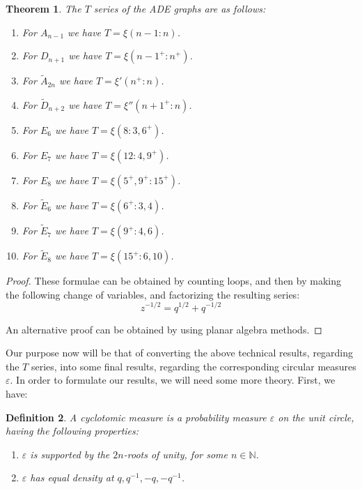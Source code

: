 \documentclass[12pt]{amsbook}
\newtheorem{theorem}{Theorem}[chapter]
\newtheorem{definition}[theorem]{Definition}
\begin{document}
\begin{theorem}
The $T$ series of the ADE graphs are as follows:
\begin{enumerate}
\item For $A_{n-1}$ we have $T=\xi(n-1:n)$.

\item For $D_{n+1}$ we have $T=\xi(n-1^+:n^+)$.

\item For $\tilde{A}_{2n}$ we have $T=\xi'(n^+:n)$.

\item For $\tilde{D}_{n+2}$ we have $T=\xi''(n+1^+:n)$.

\item For $E_6$ we have $T=\xi(8:3,6^+)$.

\item For $E_7$ we have $T=\xi(12:4,9^+)$.

\item For $E_8$ we have $T=\xi(5^+,9^+:15^+)$.

\item For $\tilde{E}_6$ we have $T=\xi(6^+:3,4)$.

\item For $\tilde{E}_7$ we have $T=\xi(9^+:4,6)$.

\item For $\tilde{E}_8$ we have $T=\xi(15^+:6,10)$.
\end{enumerate}
\end{theorem}

\begin{proof}
These formulae can be obtained by counting loops, and then by making the following change of variables, and factorizing the resulting series:
$$z^{-1/2}=q^{1/2}+q^{-1/2}$$

An alternative proof can be obtained by using planar algebra methods.
\end{proof}

Our purpose now will be that of converting the above technical results, regarding the $T$ series, into some final results, regarding the corresponding circular measures $\varepsilon$. In order to formulate our results, we will need some more theory. First, we have:

\begin{definition}
A cyclotomic measure is a probability measure $\varepsilon$ on the unit circle, having the following properties:
\begin{enumerate}
\item  $\varepsilon$ is supported by the $2n$-roots of unity, for some $n\in\mathbb N$.

\item $\varepsilon$ has equal density at $q,q^{-1},-q,-q^{-1}$.
\end{enumerate}
\end{definition}
\end{document}
